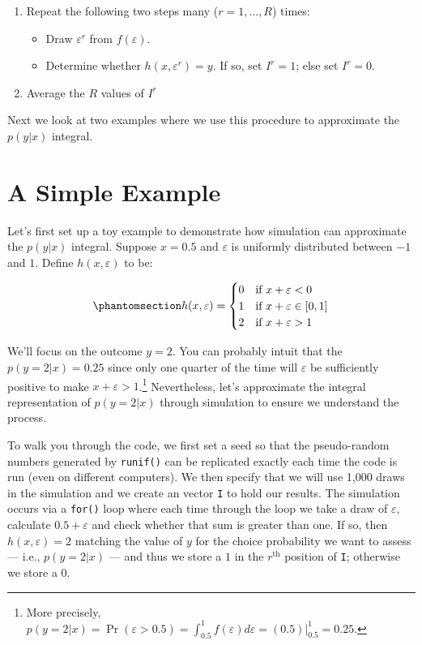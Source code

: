 \documentclass[
  letterpaper,
  DIV=11,
  numbers=noendperiod]{scrreprt}
\providecommand{\tightlist}{%
  \setlength{\itemsep}{0pt}\setlength{\parskip}{0pt}}\usepackage{longtable,booktabs,array}
\begin{document}
\begin{enumerate}
\def\labelenumi{\arabic{enumi}.}
\tightlist
\item
  Repeat the following two steps many (\(r=1, \ldots, R\)) times:

  \begin{itemize}
  \tightlist
  \item
    Draw \(\varepsilon^r\) from \(f(\varepsilon)\).
  \item
    Determine whether \(h(x,\varepsilon^r) = y\). If so, set \(I^r=1\);
    else set \(I^r=0\).
  \end{itemize}
\item
  Average the \(R\) values of \(I^r\)
\end{enumerate}

Next we look at two examples where we use this procedure to approximate
the \(p(y|x)\) integral.

\section{A Simple Example}\label{sec-simple_example}

Let's first set up a toy example to demonstrate how simulation can
approximate the \(p(y|x)\) integral. Suppose \(x=0.5\) and
\(\varepsilon\) is uniformly distributed between \(-1\) and \(1\).
Define \(h(x, \varepsilon)\) to be:

\begin{equation}\phantomsection\label{eq-h_uniform}{
h(x, \varepsilon) = 
    \begin{cases}
        0  & \text{if } x + \varepsilon < 0 \\
        1  & \text{if } x + \varepsilon \in [0,1] \\
        2  & \text{if } x + \varepsilon > 1
    \end{cases}
}\end{equation}

We'll focus on the outcome \(y=2\). You can probably intuit that the
\(p(y=2 | x) = 0.25\) since only one quarter of the time will
\(\varepsilon\) be sufficiently positive to make
\(x + \varepsilon > 1\).\footnote{More precisely,
  \(p(y=2|x) = \Pr(\varepsilon > 0.5) = \int_{0.5}^1 f(\varepsilon) d\varepsilon = (0.5)\vert_{0.5}^1 = 0.25\).}
Nevertheless, let's approximate the integral representation of
\(p(y=2|x)\) through simulation to ensure we understand the process.

To walk you through the code, we first set a seed so that the
pseudo-random numbers generated by \texttt{runif()} can be replicated
exactly each time the code is run (even on different computers). We then
specify that we will use 1,000 draws in the simulation and we create an
vector \texttt{I} to hold our results. The simulation occurs via a
\texttt{for()} loop where each time through the loop we take a draw of
\(\varepsilon\), calculate \(0.5 + \varepsilon\) and check whether that
sum is greater than one. If so, then \(h(x,\varepsilon)=2\) matching the
value of \(y\) for the choice probability we want to assess --- i.e.,
\(p(y=2|x)\) --- and thus we store a \(1\) in the \(r^\textrm{th}\)
position of \texttt{I}; otherwise we store a 0.
\end{document}
